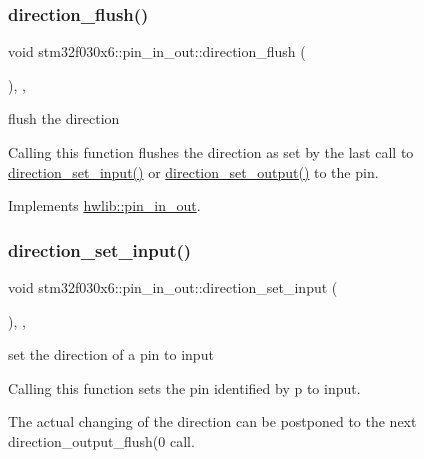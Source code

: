 \subsubsection{\texorpdfstring{direction\+\_\+flush()}{direction\_flush()}}
{\footnotesize\ttfamily void stm32f030x6\+::pin\+\_\+in\+\_\+out\+::direction\+\_\+flush (\begin{DoxyParamCaption}{ }\end{DoxyParamCaption})\hspace{0.3cm}{\ttfamily [inline]}, {\ttfamily [override]}, {\ttfamily [virtual]}}

flush the direction

Calling this function flushes the direction as set by the last call to \hyperlink{classstm32f030x6_1_1pin__in__out_acdd7df5a6a647c2e4f63587880a855ca}{direction\+\_\+set\+\_\+input()} or \hyperlink{classstm32f030x6_1_1pin__in__out_a67a4cc5a76ccf6070d6aad1b5c7bfc01}{direction\+\_\+set\+\_\+output()} to the pin. 

Implements \hyperlink{classhwlib_1_1pin__in__out_a86ef2b296683d8c0133280075c82cb51}{hwlib\+::pin\+\_\+in\+\_\+out}.

\mbox{\label{classstm32f030x6_1_1pin__in__out_acdd7df5a6a647c2e4f63587880a855ca}} 
\subsubsection{\texorpdfstring{direction\+\_\+set\+\_\+input()}{direction\_set\_input()}}
{\footnotesize\ttfamily void stm32f030x6\+::pin\+\_\+in\+\_\+out\+::direction\+\_\+set\+\_\+input (\begin{DoxyParamCaption}{ }\end{DoxyParamCaption})\hspace{0.3cm}{\ttfamily [inline]}, {\ttfamily [override]}, {\ttfamily [virtual]}}

set the direction of a pin to input

Calling this function sets the pin identified by p to input.

The actual changing of the direction can be postponed to the next direction\+\_\+output\+\_\+flush(0 call. 

